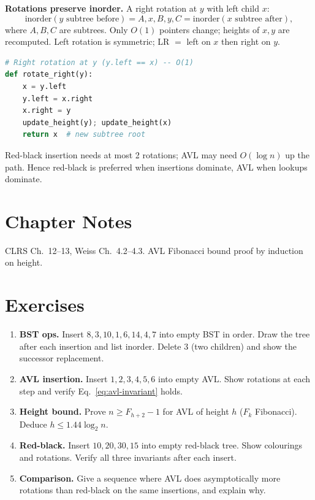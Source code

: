 \textbf{Rotations preserve inorder.} A right rotation at $y$ with left child $x$:
\begin{equation}
\text{inorder}(y\text{ subtree before}) = A,x,B,y,C = \text{inorder}(x\text{ subtree after}),
\end{equation}
where $A,B,C$ are subtrees. Only $O(1)$ pointers change; heights of $x,y$ are recomputed. Left rotation is symmetric; LR $=$ left on $x$ then right on $y$.

\begin{lstlisting}[language=Python]
# Right rotation at y (y.left == x) -- O(1)
def rotate_right(y):
    x = y.left
    y.left = x.right
    x.right = y
    update_height(y); update_height(x)
    return x  # new subtree root
\end{lstlisting}

\begin{remark}
Red-black insertion needs at most 2 rotations; AVL may need $O(\log n)$ up the path. Hence red-black is preferred when insertions dominate, AVL when lookups dominate.
\end{remark}

\section{Chapter Notes}
CLRS Ch.~12--13, Weiss Ch.~4.2--4.3. AVL Fibonacci bound proof by induction on height.

\section{Exercises}
\label{sec:ch04-exercises}
\begin{enumerate}[label=E4.\arabic*, leftmargin=*, itemsep=0.7em]
    \item \textbf{BST ops.} Insert $8,3,10,1,6,14,4,7$ into empty BST in order. Draw the tree after each insertion and list inorder. Delete $3$ (two children) and show the successor replacement.
    \item \textbf{AVL insertion.} Insert $1,2,3,4,5,6$ into empty AVL. Show rotations at each step and verify Eq.~\eqref{eq:avl-invariant} holds.
    \item \textbf{Height bound.} Prove $n\ge F_{h+2}-1$ for AVL of height $h$ ($F_{k}$ Fibonacci). Deduce $h\le1.44\log_{2}n$.
    \item \textbf{Red-black.} Insert $10,20,30,15$ into empty red-black tree. Show colourings and rotations. Verify all three invariants after each insert.
    \item \textbf{Comparison.} Give a sequence where AVL does asymptotically more rotations than red-black on the same insertions, and explain why.
\end{enumerate}
